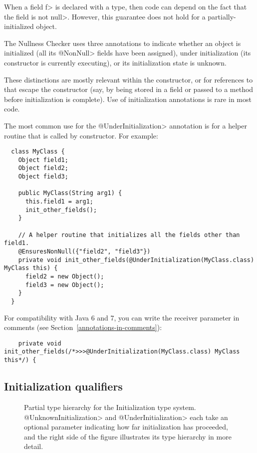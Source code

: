 \noindent
When a field \<f> is declared with a 
type, then code can depend on the fact that the field is not \<null>.
However, this guarantee does not hold for a partially-initialized object.

The Nullness Checker uses three annotations to indicate whether an object
is initialized (all its \<@NonNull> fields have been assigned), under
initialization (its constructor is currently executing), or its
initialization state is unknown.

These distinctions are mostly relevant within the constructor, or for
references to  that escape the constructor (say, by being stored
in a field or passed to a method before initialization is complete).
Use of initialization annotations is rare in most code.

The most common use for the \<@UnderInitialization> annotation is for a
helper routine that is called by constructor.  For example:

\begin{Verbatim}
  class MyClass {
    Object field1;
    Object field2;
    Object field3;

    public MyClass(String arg1) {
      this.field1 = arg1;
      init_other_fields();
    }

    // A helper routine that initializes all the fields other than field1.
    @EnsuresNonNull({"field2", "field3"})
    private void init_other_fields(@UnderInitialization(MyClass.class) MyClass this) {
      field2 = new Object();
      field3 = new Object();
    }
  }
\end{Verbatim}

For compatibility with Java 6 and 7, you can write the receiver
parameter in comments (see Section~\ref{annotations-in-comments}):
\begin{Verbatim}
    private void init_other_fields(/*>>>@UnderInitialization(MyClass.class) MyClass this*/) {
\end{Verbatim}


\subsection{Initialization qualifiers\label{initialization-qualifiers}}

\begin{figure}
\caption{Partial type hierarchy for the Initialization type system.
  \<@UnknownInitialization> and \<@UnderInitialization> each take an
  optional parameter indicating how far initialization has proceeded, and
  the right side of the figure illustrates its type hierarchy in more detail.}
\label{fig-initialization-hierarchy}
\end{figure}

